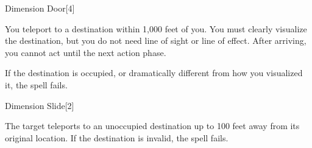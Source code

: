 \begin{spellsection}{Dimension Door}[4]
    \begin{spellheader}
    \end{spellheader}
    \begin{spellcontent}
        \begin{spelltargetinginfo}
        \end{spelltargetinginfo}
        \begin{spelleffects}
            \spelleffect You teleport to a destination within 1,000 feet of you. You must clearly visualize the destination, but you do not need line of sight or line of effect. After arriving, you cannot act until the next action phase.

            If the destination is occupied, or dramatically different from how you visualized it, the spell fails.
        \end{spelleffects}
    \end{spellcontent}
    \begin{spellfooter}
        \miscastexplode
    \end{spellfooter}
    \begin{spellaugments}
    \end{spellaugments}
\end{spellsection}

\begin{spellsection}{Dimension Slide}[2]
    \begin{spellheader}
    \end{spellheader}
    \begin{spellcontent}
        \begin{spelltargetinginfo}
        \end{spelltargetinginfo}
        \begin{spelleffects}
            \spelleffect The target teleports to an unoccupied destination up to 100 feet away from its original location. If the destination is invalid, the spell fails.
        \end{spelleffects}
    \end{spellcontent}
    \begin{spellfooter}
        \miscastrandom
    \end{spellfooter}
    \begin{spellaugments}
    \end{spellaugments}
\end{spellsection}

